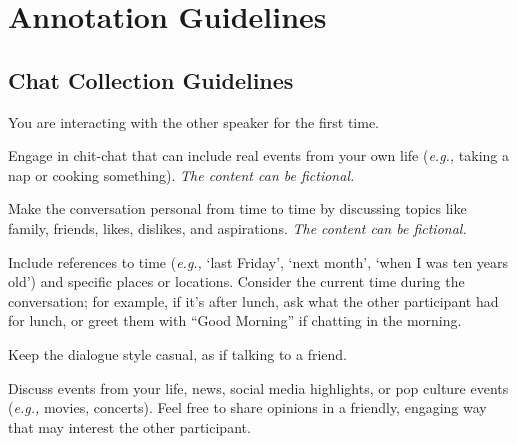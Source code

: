 \onecolumn
\section{Annotation Guidelines}
\enlargethispage{1\baselineskip}

\subsection{Chat Collection Guidelines}
\label{appendix:chat-guidelines}
\nopagebreak

\begin{tcolorbox}[title=Chat Guidelines for Participants, myboxstyle, breakable, before skip=0pt]
\begin{description}[align=left, labelwidth=5em, labelindent=0em, itemsep=1em]
    \item[\textbf{First-Time Interaction.}]
    You are interacting with the other speaker for the first time.

    \item[\textbf{Chit-chat.}]
    Engage in chit-chat that can include real events from your own life (\textit{e.g.,} taking a nap or cooking something).
    \textit{The content can be fictional.}

    \item[\textbf{Personal Information.}]
    Make the conversation personal from time to time by discussing topics like family, friends, likes, dislikes, and aspirations.
    \textit{The content can be fictional.}

    \item[\textbf{Time References.}]
    Include references to time (\textit{e.g.,} ‘last Friday’, ‘next month’, ‘when I was ten years old’) and specific places or locations.
    Consider the current time during the conversation; for example, if it’s after lunch, ask what the other participant had for lunch, or greet them with “Good Morning” if chatting in the morning.

    \item[\textbf{Dialog Style.}]
    Keep the dialogue style casual, as if talking to a friend.

    \item[\textbf{Daily Events and News.}]
    Discuss events from your life, news, social media highlights, or pop culture events (\textit{e.g.,} movies, concerts).
    Feel free to share opinions in a friendly, engaging way that may interest the other participant.


\end{description}
\end{tcolorbox}
